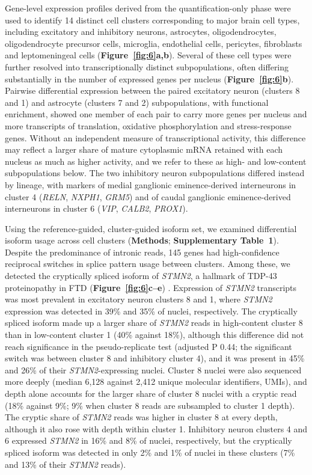 Gene-level expression profiles derived from the quantification-only phase were used to identify 14 distinct cell clusters corresponding to major brain cell types, including excitatory and inhibitory neurons, astrocytes, oligodendrocytes, oligodendrocyte precursor cells, microglia, endothelial cells, pericytes, fibroblasts and leptomeningeal cells (\textbf{Figure~\ref{fig:6}a,b}). Several of these cell types were further resolved into transcriptionally distinct subpopulations, often differing substantially in the number of expressed genes per nucleus (\textbf{Figure~\ref{fig:6}b}). Pairwise differential expression between the paired excitatory neuron (clusters 8 and 1) and astrocyte (clusters 7 and 2) subpopulations, with functional enrichment, showed one member of each pair to carry more genes per nucleus and more transcripts of translation, oxidative phosphorylation and stress-response genes. Without an independent measure of transcriptional activity, this difference may reflect a larger share of mature cytoplasmic mRNA retained with each nucleus as much as higher activity, and we refer to these as high- and low-content subpopulations below. The two inhibitory neuron subpopulations differed instead by lineage, with markers of medial ganglionic eminence-derived interneurons in cluster 4 (\emph{RELN}, \emph{NXPH1}, \emph{GRM5}) and of caudal ganglionic eminence-derived interneurons in cluster 6 (\emph{VIP}, \emph{CALB2}, \emph{PROX1}).

Using the reference-guided, cluster-guided isoform set, we examined differential isoform usage across cell clusters (\textbf{Methods}; \textbf{Supplementary Table~1}). Despite the predominance of intronic reads, 145 genes had high-confidence reciprocal switches in splice pattern usage between clusters. Among these, we detected the cryptically spliced isoform of \emph{STMN2}, a hallmark of TDP-43 proteinopathy in FTD (\textbf{Figure~\ref{fig:6}c--e}) \citep{prudencio2020, melamed2019, klim2019}. Expression of \emph{STMN2} transcripts was most prevalent in excitatory neuron clusters 8 and 1, where \emph{STMN2} expression was detected in 39\% and 35\% of nuclei, respectively. The cryptically spliced isoform made up a larger share of \emph{STMN2} reads in high-content cluster 8 than in low-content cluster 1 (40\% against 18\%), although this difference did not reach significance in the pseudo-replicate test (adjusted P 0.44; the significant switch was between cluster 8 and inhibitory cluster 4), and it was present in 45\% and 26\% of their \emph{STMN2}-expressing nuclei. Cluster 8 nuclei were also sequenced more deeply (median 6,128 against 2,412 unique molecular identifiers, UMIs), and depth alone accounts for the larger share of cluster 8 nuclei with a cryptic read (18\% against 9\%; 9\% when cluster 8 reads are subsampled to cluster 1 depth). The cryptic share of \emph{STMN2} reads was higher in cluster 8 at every depth, although it also rose with depth within cluster 1. Inhibitory neuron clusters 4 and 6 expressed \emph{STMN2} in 16\% and 8\% of nuclei, respectively, but the cryptically spliced isoform was detected in only 2\% and 1\% of nuclei in these clusters (7\% and 13\% of their \emph{STMN2} reads).

